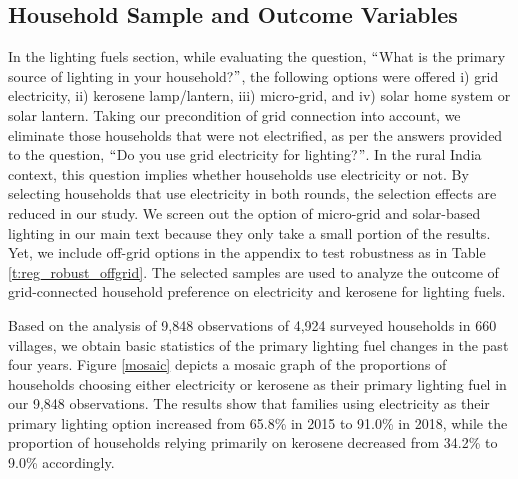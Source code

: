 \documentclass[11pt,english]{article}
\theoremstyle{plain} \newtheorem{claim}{Claim}
\theoremstyle{plain} \newtheorem{prop}{Proposition}
\theoremstyle{plain} \newtheorem{hypo}{Hypothesis}
\begin{document}
\subsection{Household Sample and Outcome Variables}

In the lighting fuels section, while evaluating the question, $``$What is the primary source of lighting in your household?$"$, the following options were offered i) grid electricity, ii) kerosene lamp/lantern, iii) micro-grid, and iv) solar home system or solar lantern. Taking our precondition of grid connection into account, we eliminate those households that were not electrified, as per the answers provided to the question, $``$Do you use grid electricity for lighting?$"$. In the rural India context, this question implies whether households use electricity or not. By selecting households that use electricity in both rounds, the selection effects are reduced in our study. We screen out the option of micro-grid and solar-based lighting in our main text because they only take a small portion of the results. Yet, we include off-grid options in the appendix to test robustness as in Table \ref{t:reg_robust_offgrid}. The selected samples are used to analyze the outcome of grid-connected household preference on electricity and kerosene for lighting fuels.

Based on the analysis of 9,848 observations of 4,924 surveyed households in 660 villages, we obtain basic statistics of the primary lighting fuel changes in the past four years. Figure \ref{mosaic} depicts a mosaic graph of the proportions of households choosing either electricity or kerosene as their primary lighting fuel in our 9,848 observations. The results show that families using electricity as their primary lighting option increased from 65.8\% in 2015 to 91.0\% in 2018, while the proportion of households relying primarily on kerosene decreased from 34.2\% to 9.0\% accordingly.
\end{document}
